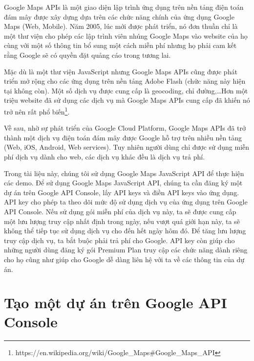 \documentclass[../thesis.tex]{subfiles}
\begin{document}
Google Maps APIs là một giao diện lập trình ứng dụng trên nền tảng điện toán đám mây được xây dựng dựa trên các chức năng chính của ứng dụng Google Maps (Web, Mobile). Năm 2005, lúc mới được phát triển, nó đơn thuần chỉ là một thư viện cho phép các lập trình viên nhúng Google Maps vào website của họ cùng với một số thông tin bổ sung một cách miễn phí nhưng họ phải cam kết rằng Google sẽ có quyền đặt quảng cáo trong tương lai.

Mặc dù là một thư viện JavaScript nhưng Google Maps APIs cũng được phát triển mở rộng cho các ứng dụng trên nền tảng Adobe Flash (chức năng này hiện tại không còn). Một số dịch vụ được cung cấp là geocoding, chỉ đường,\ldots Hơn một triệu website đã sử dụng các dịch vụ mà Google Maps APIs cung cấp đã khiến nó trở nên rất phổ biến\footnote{https://en.wikipedia.org/wiki/Google\_Maps\#Google\_Maps\_API}.

Về sau, nhờ sự phát triển của Google Cloud Platform, Google Maps APIs đã trở thành một dịch vụ điện toán đám mây được Google hỗ trợ trên nhiều nền tảng (Web, iOS, Android, Web services). Tuy nhiên người dùng chỉ được sử dụng miễn phí dịch vụ dành cho web, các dịch vụ khác đều là dịch vụ trả phí.

Trong tài liệu này, chúng tôi sử dụng Google Maps JavaScript API để thực hiện các demo. Để sử dụng Google Maps JavaScript API, chúng ta cần đăng ký một dự án trên Google API Console, lấy API keys và điền API keys vào ứng dụng. API key cho phép ta theo dõi mức độ sử dụng dịch vụ của ứng dụng trên Google API Console. Nếu sử dụng gói miễn phí của dịch vụ này, ta sẽ được cung cấp một lưu lượng truy cập nhất định trong ngày, nếu vượt quá giới hạn này, ta sẽ không thể tiếp tục sử dụng dịch vụ cho đến hết ngày hôm đó. Để tăng lưu lượng truy cập dịch vụ, ta bắt buộc phải trả phí cho Google. API key còn giúp cho những người dùng đăng ký gói Premium Plan truy cập các chức năng dành riêng cho họ cũng như giúp cho Google dễ dàng liên hệ với ta về các thông tin của dự án.

\section{Tạo một dự án trên Google API Console}
\end{document}
